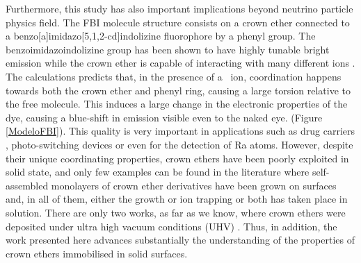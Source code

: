 \documentclass[aps,prl,reprint,longbibliography,superscriptaddress, english]{revtex4-1}
\begin{document}
Furthermore, this study has also important implications beyond neutrino particle physics field. The FBI molecule structure consists on a crown ether connected to a benzo[a]imidazo[5,1,2-cd]indolizine fluorophore by a phenyl group. The benzoimidazoindolizine group has been shown to have highly tunable bright emission\cite{Stasyuk_benzo,Levesque_general} while the crown ether is capable of interacting with many different ions \cite{valeur_chemical,maleknia_cavity-size-dependent_2002}. The calculations predicts that, in the presence of a \Bapp\ ion, coordination happens towards both the crown ether and phenyl ring, causing a large torsion relative to the free molecule. This induces a large change in the electronic properties of the dye, causing a blue-shift in emission visible even to the naked eye. (Figure \ref{ModeloFBI}).  
This quality is very important in applications such as drug carriers \cite{uchegbu_non-ionic_1998}, photo-switching devices \cite{malval_photoswitching_2002,uda_membrane_2005} or even for the detection of Ra atoms. However, despite their unique coordinating properties\cite{more_intrinsic_1999,dobler1981ionophores,maleknia_cavity-size-dependent_2002}, crown ethers have been poorly exploited in solid state, and only few examples can be found in the literature where self-assembled monolayers of crown ether derivatives have been grown on surfaces\cite{yoshimoto_hostguest_2003,flink_recognition_1999,inokuchi_new_2015}  and, in all of them, either the growth or ion trapping or both has taken place in solution. 
 There are only two works, as far as we know, where crown ethers were deposited under ultra high vacuum conditions (UHV) \cite{feng_growth_2018,stredansky_-surface_2019}. 
Thus, in addition, the work presented here advances substantially the understanding of the properties of crown ethers immobilised in solid surfaces.

\end{document}
